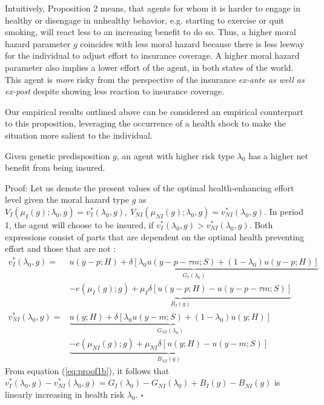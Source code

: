 Intuitively, Proposition 2 means, that agents for whom it is harder to engage in healthy or disengage in unhealthy behavior, e.g. starting to exercise or quit smoking, will react less to an increasing benefit to do so.
Thus, a higher moral hazard parameter $g$ coincides with less moral hazard because there is less leeway for the individual to adjust effort to insurance coverage.
A higher moral hazard parameter also implies a lower effort of the agent, in both states of the world.
This agent is \textit{more} risky from the perspective of the insurance \textit{ex-ante as well as ex-post} despite showing less reaction to insurance coverage.

Our empirical results outlined above can be considered an empirical counterpart to this proposition, leveraging the occurrence of a health shock to make the situation more salient to the individual.


\begin{proposition}
	Given genetic predisposition $g$, an agent with higher risk type $\lambda_0$ has a higher net benefit from being insured.
\end{proposition}

Proof: Let us denote the present values of the optimal health-enhancing effort level given the moral hazard type $g$ as $V_I(\mu_I(g);\lambda_0,g)=v_I^*(\lambda_0,g),\ V_{NI}(\mu_{NI}(g);\lambda_0,g)=v_{NI}^*(\lambda_0,g)$.
In period 1, the agent will choose to be insured, if $v_I^*(\lambda_0,g)>v_{NI}^*(\lambda_0,g)$. Both expressions consist of parts that are dependent on the optimal health preventing effort and those that are not :
\begin{align*}
	v_I^*(\lambda_0,g)=&\underbrace{u(y-p;H)+\delta\left[ \lambda_0 u(y-p-\tau m;S)+(1-\lambda_0)u(y-p;H)\right]}_{G_I(\lambda_0)} \\
	&\underbrace{-e(\mu_I(g);g)+\mu_I\delta\left[ u(y-p;H)-u(y-p-\tau m;S)\right]}_{B_I(g)}\\
	v_{NI}^*(\lambda_0,g)=&\underbrace{u(y;H)+\delta\left[ \lambda_0 u(y-m;S)+(1-\lambda_0)u(y;H)\right]}_{G_{NI}(\lambda_0)} \\
	&\underbrace{-e(\mu_{NI}(g);g)+\mu_{NI}\delta\left[ u(y;H)-u(y-m;S)\right]}_{B_{NI}(g)}
\end{align*}
From equation (\ref{eq:proof1b}), it follows that $v_I^*(\lambda_0,g)-v_{NI}^*(\lambda_0,g)=G_I(\lambda_0)-G_{NI}(\lambda_0)+B_I(g)-B_{NI}(g)$ is linearly increasing in health risk $\lambda_0$. $\square$ \\

